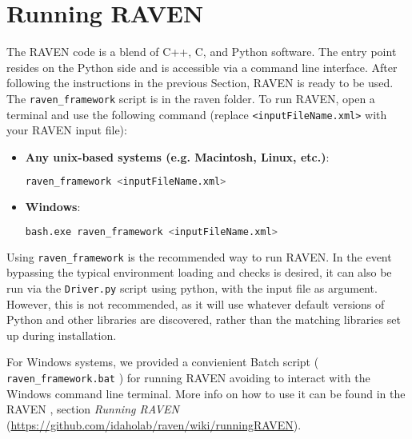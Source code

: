 \section{Running RAVEN}
\label{HowToRun}

The RAVEN code is a blend of C++, C, and Python software. The entry point
resides on the Python side and is accessible via a command line interface.
%
After following the instructions in the previous Section, RAVEN is ready to be
used.
%
The \texttt{raven\_framework} script is in the raven folder.
%
To run RAVEN, open a terminal and use the following command (replace \texttt{<inputFileName.xml>} with your RAVEN input file):

\begin{itemize}

  \item \textbf{Any unix-based systems (e.g. Macintosh, Linux, etc.)}:
\begin{lstlisting}[language=bash]
raven_framework <inputFileName.xml>
\end{lstlisting}
  \item \textbf{Windows}:
  \begin{lstlisting}[language=bash]
bash.exe raven_framework <inputFileName.xml>
\end{lstlisting}
  
\end{itemize}

Using \texttt{raven\_framework} is the recommended way to run RAVEN.  In the event bypassing the typical
environment loading and checks is desired, it can also be run via
the \texttt{Driver.py} script using python, with the input file as argument.  However, this is not
recommended, as it will use whatever default versions of Python and other libraries are discovered, rather
than the matching libraries set up during installation.

\nb For Windows systems, we provided a convienient Batch script ( \texttt{raven\_framework.bat} ) for running RAVEN 
avoiding to interact with the Windows command line terminal. More info on how to use it can be found in the RAVEN
\wiki , section \textit{Running RAVEN} (\url{https://github.com/idaholab/raven/wiki/runningRAVEN}).

